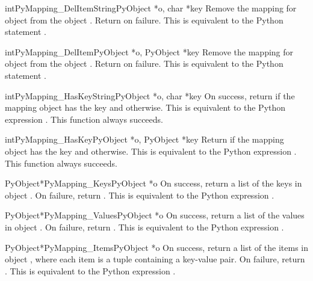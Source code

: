 \begin{cfuncdesc}{int}{PyMapping_DelItemString}{PyObject *o, char *key}
  Remove the mapping for object  from the object .
  Return  on failure.  This is equivalent to the Python
  statement .
\end{cfuncdesc}


\begin{cfuncdesc}{int}{PyMapping_DelItem}{PyObject *o, PyObject *key}
  Remove the mapping for object  from the object .
  Return  on failure.  This is equivalent to the Python
  statement .
\end{cfuncdesc}


\begin{cfuncdesc}{int}{PyMapping_HasKeyString}{PyObject *o, char *key}
  On success, return  if the mapping object has the key
   and  otherwise.  This is equivalent to the Python
  expression .  This function always
  succeeds.
\end{cfuncdesc}


\begin{cfuncdesc}{int}{PyMapping_HasKey}{PyObject *o, PyObject *key}
  Return  if the mapping object has the key  and
   otherwise.  This is equivalent to the Python expression
  .  This function always succeeds.
\end{cfuncdesc}


\begin{cfuncdesc}{PyObject*}{PyMapping_Keys}{PyObject *o}
  On success, return a list of the keys in object .  On
  failure, return \NULL. This is equivalent to the Python expression
  .
\end{cfuncdesc}


\begin{cfuncdesc}{PyObject*}{PyMapping_Values}{PyObject *o}
  On success, return a list of the values in object .  On
  failure, return \NULL. This is equivalent to the Python expression
  .
\end{cfuncdesc}


\begin{cfuncdesc}{PyObject*}{PyMapping_Items}{PyObject *o}
  On success, return a list of the items in object , where each
  item is a tuple containing a key-value pair.  On failure, return
  \NULL. This is equivalent to the Python expression
  .
\end{cfuncdesc}


